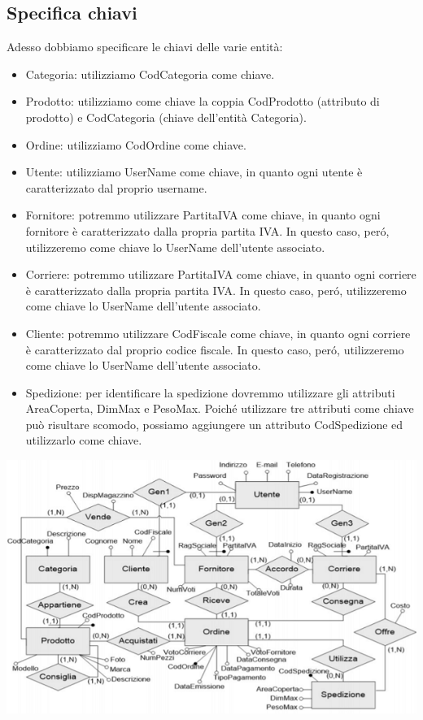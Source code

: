 \subsection{Specifica chiavi}
Adesso dobbiamo specificare le chiavi delle varie entità:
\begin{itemize}
	\item Categoria: utilizziamo CodCategoria come chiave. 
	\item Prodotto: utilizziamo come chiave la coppia CodProdotto (attributo di prodotto) e CodCategoria
	(chiave dell’entità Categoria). 
	\item Ordine: utilizziamo CodOrdine come chiave. 
	\item Utente: utilizziamo UserName come chiave, in quanto ogni utente è caratterizzato dal proprio username. 
	\item Fornitore: potremmo utilizzare PartitaIVA come chiave, in quanto ogni fornitore è caratterizzato dalla propria partita IVA. In questo caso, peró, utilizzeremo come chiave lo UserName dell’utente associato.
	\item Corriere: potremmo utilizzare PartitaIVA come chiave, in quanto ogni corriere è caratterizzato dalla propria partita IVA. In questo caso, peró, utilizzeremo come chiave lo UserName dell’utente associato. 
	\item Cliente: potremmo utilizzare CodFiscale come chiave,
	in quanto ogni corriere è caratterizzato dal proprio codice fiscale. In questo caso, peró, utilizzeremo come chiave lo UserName dell’utente associato. 
	\item Spedizione: per identificare la spedizione dovremmo utilizzare gli attributi AreaCoperta, DimMax e PesoMax. Poiché utilizzare tre attributi come chiave
	può risultare scomodo, possiamo aggiungere un attributo CodSpedizione ed utilizzarlo come chiave.
\end{itemize}
\begin{center}
	\includegraphics{images/93.PNG}
\end{center}
